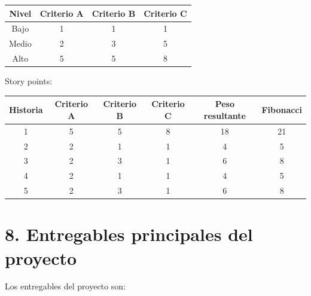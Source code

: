 \documentclass[
11pt, %
]{charter}
\begin{document}
\begin{table}[H]
\begin{tabular}{c c c c}
\hline
\rowcolor[HTML]{C0C0C0} 
Nivel           & Criterio A     & Criterio B 	    & Criterio C 	 \\ \hline
Bajo            & 1              & 1	            & 1              \\ \hline
Medio           & 2              & 3                & 5               \\ \hline
Alto            & 5              & 5        	    & 8 	          \\ \hline
\end{tabular}
\end{table}

Story points:

\begin{table}[H]
\begin{tabular}{c c c c c c}
\hline
\rowcolor[HTML]{C0C0C0} 
Historia           & Criterio A     & Criterio B 	    & Criterio C   & Peso resultante  & Fibonacci	 \\ \hline
1                  & 5              & 5	                & 8            &  18              &  21            \\ \hline
2                  & 2              & 1                 & 1            &  4               &  5            \\ \hline
3                  & 2              & 3        	        & 1 	       &  6               &  8              \\ \hline
4                  & 2              & 1        	        & 1 	       &  4               &  5             \\ \hline
5                  & 2              & 3        	        & 1 	       &  6               &  8              \\ \hline
\end{tabular}
\end{table}


\section{8. Entregables principales del proyecto}
\label{sec:entregables}


Los entregables del proyecto son:
\end{document}
